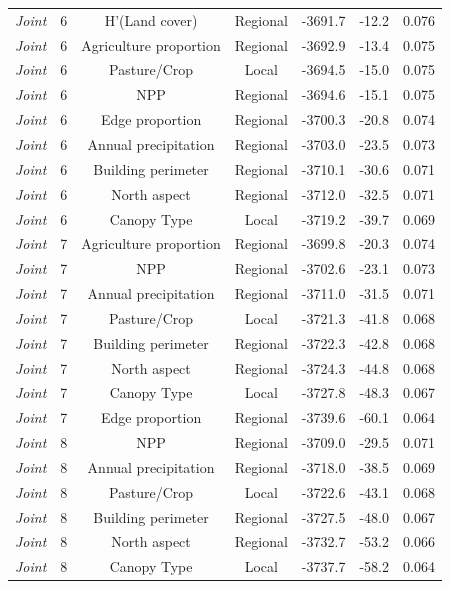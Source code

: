 \documentclass[preprint,final,times,12pt,3p]{elsarticle}
\begin{document}
\begin{longtable}{ c c c c c c c}
	\emph{Joint} & 6 & H'(Land cover) & Regional & -3691.7 & -12.2 & 0.076 \\
	\emph{Joint} & 6 & Agriculture proportion & Regional & -3692.9 & -13.4 & 0.075 \\
	\emph{Joint} & 6 & Pasture/Crop & Local & -3694.5 & -15.0 & 0.075 \\
	\emph{Joint} & 6 & NPP & Regional & -3694.6 & -15.1 & 0.075 \\
	\emph{Joint} & 6 & Edge proportion & Regional & -3700.3 & -20.8 & 0.074 \\
	\emph{Joint} & 6 & Annual precipitation & Regional & -3703.0 & -23.5 & 0.073 \\
	\emph{Joint} & 6 & Building perimeter & Regional & -3710.1 & -30.6 & 0.071 \\
	\emph{Joint} & 6 & North aspect & Regional & -3712.0 & -32.5 & 0.071 \\
	\emph{Joint} & 6 & Canopy Type & Local & -3719.2 & -39.7 & 0.069 \\
	\emph{Joint} & 7 & Agriculture proportion & Regional & -3699.8 & -20.3 & 0.074 \\
	\emph{Joint} & 7 & NPP & Regional & -3702.6 & -23.1 & 0.073 \\
	\emph{Joint} & 7 & Annual precipitation & Regional & -3711.0 & -31.5 & 0.071 \\
	\emph{Joint} & 7 & Pasture/Crop & Local & -3721.3 & -41.8 & 0.068 \\
	\emph{Joint} & 7 & Building perimeter & Regional & -3722.3 & -42.8 & 0.068 \\
	\emph{Joint} & 7 & North aspect & Regional & -3724.3 & -44.8 & 0.068 \\
	\emph{Joint} & 7 & Canopy Type & Local & -3727.8 & -48.3 & 0.067 \\
	\emph{Joint} & 7 & Edge proportion & Regional & -3739.6 & -60.1 & 0.064 \\
	\emph{Joint} & 8 & NPP & Regional & -3709.0 & -29.5 & 0.071 \\
	\emph{Joint} & 8 & Annual precipitation & Regional & -3718.0 & -38.5 & 0.069 \\
	\emph{Joint} & 8 & Pasture/Crop & Local & -3722.6 & -43.1 & 0.068 \\
	\emph{Joint} & 8 & Building perimeter & Regional & -3727.5 & -48.0 & 0.067 \\
	\emph{Joint} & 8 & North aspect & Regional & -3732.7 & -53.2 & 0.066 \\
	\emph{Joint} & 8 & Canopy Type & Local & -3737.7 & -58.2 & 0.064 \\

\end{longtable}
\end{document}
